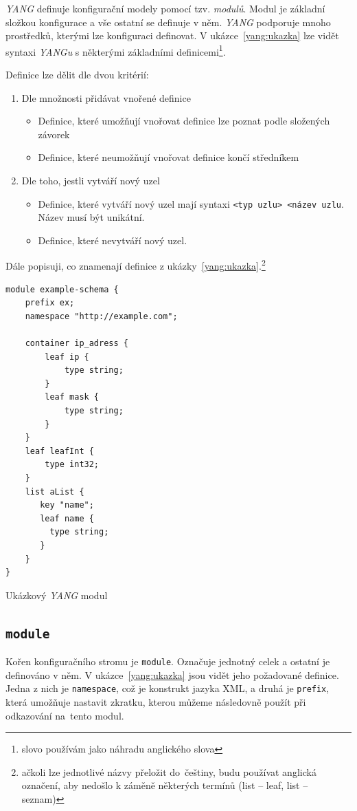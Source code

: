 \documentclass[thesis=B,czech,hidelinks]{FITthesis}[2019/03/06]
\begin{document}
\textit{YANG} definuje konfigurační modely pomocí tzv. \textit{modulů}. Modul je základní složkou konfigurace a vše ostatní se definuje v něm. \textit{YANG} podporuje mnoho prostředků, kterými lze konfiguraci definovat. V ukázce~\ref{yang:ukazka} lze vidět syntaxi \textit{YANGu} s některými základními definicemi\footnote{slovo  používám jako náhradu anglického slova }.

Definice lze dělit dle dvou kritérií:

\begin{enumerate}
    \item Dle množnosti přidávat vnořené definice
        \begin{itemize}
            \item Definice, které umožňují vnořovat definice lze poznat podle složených závorek
            \item Definice, které neumožňují vnořovat definice končí středníkem
        \end{itemize}
    \item Dle toho, jestli vytváří nový uzel
        \begin{itemize}
            \item Definice, které vytváří nový uzel mají syntaxi \texttt{<typ~uzlu>~<název~uzlu}. Název musí být unikátní.
            \item Definice, které nevytváří nový uzel.
        \end{itemize}
\end{enumerate}

Dále popisuji, co znamenají definice z ukázky~\ref{yang:ukazka}.\footnote{ačkoli lze jednotlivé názvy přeložit do~češtiny, budu používat anglická označení, aby nedošlo k záměně některých termínů (list -- leaf, list -- seznam)}

\begin{listing}
\begin{verbatim}
module example-schema {
    prefix ex;
    namespace "http://example.com";

    container ip_adress {
        leaf ip {
            type string;
        }
        leaf mask {
            type string;
        }
    }
    leaf leafInt {
        type int32;
    }
    list aList {
       key "name";
       leaf name {
         type string;
       }
    }
}
\end{verbatim}
\caption{Ukázkový \textit{YANG} modul}\label{yang:ukazka}
\end{listing}
\subsection{\texttt{module}}
Kořen konfiguračního stromu je \texttt{module}. Označuje jednotný celek a ostatní je definováno v něm. V ukázce~\ref{yang:ukazka} jsou vidět jeho požadované definice. Jedna z nich je \texttt{namespace}, což je konstrukt jazyka XML, a druhá je \texttt{prefix}, která umožňuje nastavit zkratku, kterou můžeme následovně použít při odkazování na~tento modul.
\end{document}

